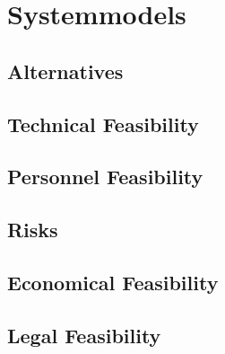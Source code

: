 \chapter{Systemmodels}
\label{ch:sysmodels}

\section{Alternatives}
\section{Technical Feasibility}
\section{Personnel Feasibility}
\section{Risks}
\section{Economical Feasibility}
\section{Legal Feasibility}
